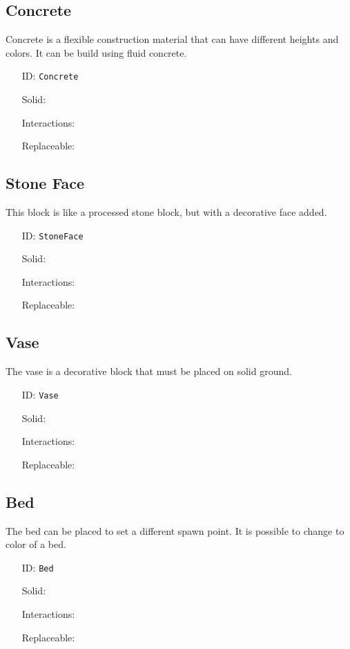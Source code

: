 \subsection{Concrete}\label{subsec:blocks_concrete}
Concrete is a flexible construction material that can have different heights and colors.
It can be build using fluid concrete.
\newline
\begin{itemize}[nosep]
    \item[ID:] \texttt{Concrete}
    \item[Solid:]  \Checkmark \item[Interactions:]  \Checkmark \item[Replaceable:]  \XSolidBrush
\end{itemize}

\subsection{Stone Face}\label{subsec:blocks_stone face}
This block is like a processed stone block, but with a decorative face added.
\newline
\begin{itemize}[nosep]
    \item[ID:] \texttt{StoneFace}
    \item[Solid:]  \Checkmark \item[Interactions:]  \XSolidBrush \item[Replaceable:]  \XSolidBrush
\end{itemize}

\subsection{Vase}\label{subsec:blocks_vase}
The vase is a decorative block that must be placed on solid ground.
\newline
\begin{itemize}[nosep]
    \item[ID:] \texttt{Vase}
    \item[Solid:]  \Checkmark \item[Interactions:]  \XSolidBrush \item[Replaceable:]  \XSolidBrush
\end{itemize}

\subsection{Bed}\label{subsec:blocks_bed}
The bed can be placed to set a different spawn point.
It is possible to change to color of a bed.
\newline
\begin{itemize}[nosep]
    \item[ID:] \texttt{Bed}
    \item[Solid:]  \Checkmark \item[Interactions:]  \Checkmark \item[Replaceable:]  \XSolidBrush
\end{itemize}

